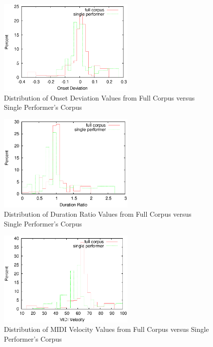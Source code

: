 \begin{figure}[tp]
   \begin{center}
      \includegraphics[width=0.6\textwidth]{fig/all_01_onset}
   \end{center}
   \caption{Distribution of Onset Deviation Values from Full Corpus versus Single Performer's Corpus}
   \label{fig:distonset}
\end{figure}
\begin{figure}[tp]
   \begin{center}
      \includegraphics[width=0.6\textwidth]{fig/all_01_duration}
   \end{center}
   \caption{Distribution of Duration Ratio Values from Full Corpus versus Single Performer's Corpus}
   \label{fig:distdur}
\end{figure}
\begin{figure}[tp]
   \begin{center}
      \includegraphics[width=0.6\textwidth]{fig/all_01_velocity}
   \end{center}
   \caption{Distribution of MIDI Velocity Values from Full Corpus versus Single Performer's Corpus}
   \label{fig:distvel}
\end{figure}


